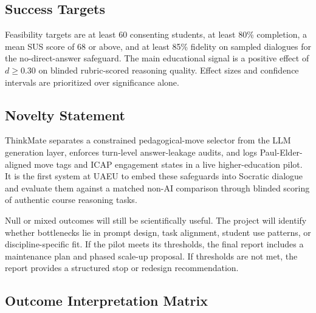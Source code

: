 \documentclass[11pt,a4paper]{article}
\begin{document}
\subsection*{Success Targets}

Feasibility targets are at least 60 consenting students, at least 80\% completion, a mean SUS score of 68 or above, and at least 85\% fidelity on sampled dialogues for the no-direct-answer safeguard. The main educational signal is a positive effect of $d \geq 0.30$ on blinded rubric-scored reasoning quality. Effect sizes and confidence intervals are prioritized over significance alone.

\subsection*{Novelty Statement}

ThinkMate separates a constrained pedagogical-move selector from the LLM generation layer, enforces turn-level answer-leakage audits, and logs Paul-Elder-aligned move tags and ICAP engagement states in a live higher-education pilot. It is the first system at UAEU to embed these safeguards into Socratic dialogue and evaluate them against a matched non-AI comparison through blinded scoring of authentic course reasoning tasks.

Null or mixed outcomes will still be scientifically useful. The project will identify whether bottlenecks lie in prompt design, task alignment, student use patterns, or discipline-specific fit. If the pilot meets its thresholds, the final report includes a maintenance plan and phased scale-up proposal. If thresholds are not met, the report provides a structured stop or redesign recommendation.

\subsection*{Outcome Interpretation Matrix}
\end{document}
